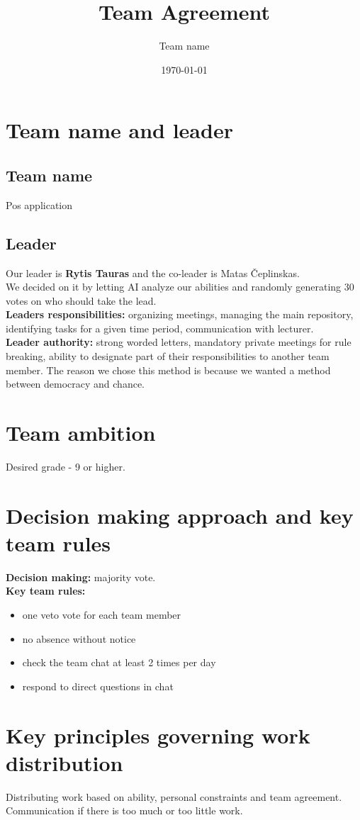 \documentclass{article}
\title{Team Agreement}
\date{\today}
\author{Team name}
\begin{document}
    
    \newpage
    \section{Team name and leader}
    \subsection{Team name} Pos application
    \subsection{Leader} Our leader is \textbf{Rytis Tauras} and the co-leader is Matas Čeplinskas.\\[0,25cm] We decided on it by letting AI analyze our abilities and randomly generating 30 votes on who should take the lead.\\[0,25cm]
    \textbf{Leaders responsibilities:} organizing meetings, managing the main repository, identifying tasks for a given time period, communication with lecturer.\\[0,25cm]
    \textbf{Leader authority:} strong worded letters, mandatory private meetings for rule breaking, ability to designate part of their responsibilities to another team member.
    The reason we chose this method is because we wanted a method between democracy and chance. 
    \section{Team ambition} Desired grade - 9 or higher.
    \section{Decision making approach and key team rules} \textbf{Decision making:} majority vote.\\[0,25cm]
    \textbf{Key team rules:} \begin{itemize}
        \item one veto vote for each team member
        \item no absence without notice
        \item check the team chat at least 2 times per day
        \item respond to direct questions in chat
    \end{itemize} 
    \section{Key principles governing work distribution} Distributing work based on ability, personal constraints and team agreement.
    Communication if there is too much or too little work.
\end{document}
